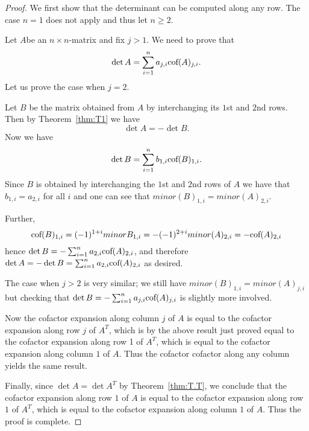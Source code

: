 \begin{proof} We first show that the determinant can be computed along any row. The case $n=1$ does not apply and thus let $n \geq 2$. 


Let $A$be an $n\times n$-matrix and fix $j>1$. We need to prove that
\[
	\det A=\sum_{i=1}^n a_{j,i} \mbox{\rm cof}(A)_{j,i}. 
\]
Let us prove the case when $j=2$. 

Let $B$ be the matrix obtained from $A$ by interchanging its $1$st and $2$nd rows. 
Then by  Theorem~\ref{thm:T1} we have
\[
\det A=-\det B. 
\]
Now we have 
\[
\det B=\sum_{i=1}^n b_{1,i} \mbox{\rm cof}(B)_{1,i}. 
\]
Since $B$ is obtained by interchanging the $1$st and $2$nd rows of $A$
we have that $b_{1,i}=a_{2,i}$ for all $i$
and one can see that $minor(B)_{1,i}=minor(A)_{2,i}$. 

Further, 
\[
\mbox{\rm cof}(B)_{1,i}=(-1)^{1+i} minor B_{1,i}=- (-1)^{2+i} minor (A)_{2,i} = - \mbox{\rm cof}(A)_{2,i}
\]
hence $\det B=-\sum_{i=1}^n a_{2,i} \mbox{\rm cof}(A)_{2,i}$, and therefore 
$\det A=-\det B=
\sum_{i=1}^n a_{2,i} \mbox{\rm cof}(A)_{2,i}$ as desired. 

The case when $j>2$ is very similar; we still have
$minor(B)_{1,i}=minor (A)_{j,i}$ but checking that $\det
B=-\sum_{i=1}^n a_{j,i} \mbox{\rm cof}(A)_{j,i}$ is slightly more
involved.

Now the cofactor expansion along column $j$ of $A$ is equal to the
cofactor expansion along row $j$ of $A^T$, which is by the above
result just proved equal to the cofactor expansion along row 1 of
$A^T$, which is equal to the cofactor expansion along column $1$ of
$A$. Thus the cofactor cofactor along any column yields the same result. 

Finally, since $\det A=\det A^T$ by  Theorem~\ref{thm:T.T}, we conclude that 
the cofactor expansion along row $1$ of $A$ is equal to 
the cofactor expansion along row $1$ of $A^T$, which  is equal to 
the cofactor expansion along column $1$ of $A$. Thus the proof is complete. 
\end{proof} 
